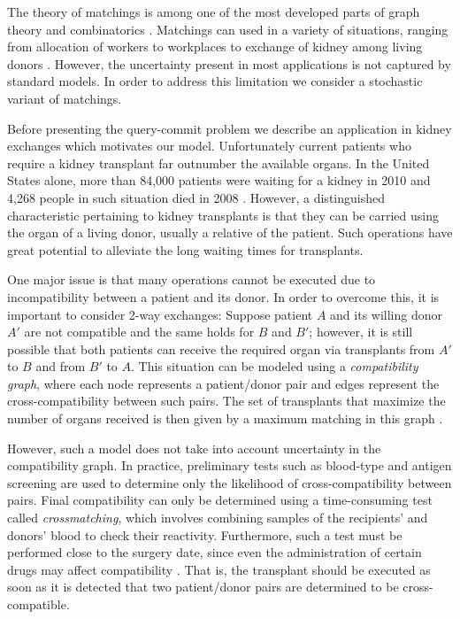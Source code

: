 \documentclass[12pt]{article}
\begin{document}
			The theory of matchings is among one of the most developed parts of graph theory and combinatorics \cite{lovasz}. Matchings can used in a variety of situations, ranging from allocation of workers to workplaces to exchange of kidney among living donors \cite{roth1}. However, the uncertainty present in most applications is not captured by standard models. In order to address this limitation we consider a stochastic variant of matchings.
			
	Before presenting the query-commit problem we describe an application in kidney exchanges which motivates our model. Unfortunately current patients who require a kidney transplant far outnumber the available organs. In the United States alone, more than 84,000 patients were waiting for a kidney in 2010 and 4,268 people in such situation died in 2008 \cite{unos}. However, a distinguished characteristic pertaining to kidney transplants is that they can be carried using the organ of a living donor, usually a relative of the patient. Such operations have great potential to alleviate the long waiting times for transplants. 
	
	One major issue is that many operations cannot be executed due to incompatibility between a patient and its donor. In order to overcome this, it is important to consider 2-way exchanges: Suppose patient $A$ and its willing donor $A'$ are not compatible and the same holds for $B$ and $B'$; however, it is still possible that both patients can receive the required organ via transplants from $A'$ to $B$ and from $B'$ to $A$. This situation can be modeled using a \emph{compatibility graph}, where each node represents a patient/donor pair and edges represent the cross-compatibility between such pairs. The set of transplants that maximize the number of organs received is then given by a maximum matching in this graph \cite{roth1, roth2}. 
	
	However, such a model does not take into account uncertainty in the compatibility graph. In practice, preliminary tests such as blood-type and antigen screening are used to determine only the likelihood of cross-compatibility between pairs. Final compatibility can only be determined using a time-consuming test called \emph{crossmatching}, which involves combining samples of the recipients' and donors' blood to check their reactivity. Furthermore, such a test must be performed close to the surgery date, since even the administration of certain drugs may affect compatibility \cite{crossmatching}. That is, the transplant should be executed as soon as it is detected that two patient/donor pairs are determined to be cross-compatible.
	
\end{document}
